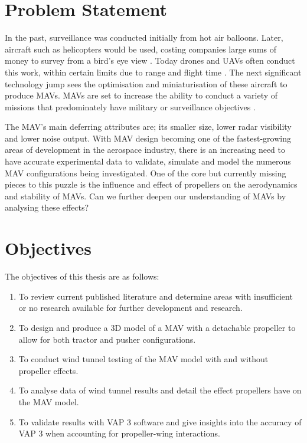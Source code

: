 % 





\section{Problem Statement}
\label{ProblemStatement}

In the past, surveillance was conducted initially from hot air balloons. Later, aircraft such as helicopters would be used, costing companies large sums of money to survey from a bird's eye view \cite{Aleksander2018}. Today drones and UAVs often conduct this work, within certain limits due to range and flight time \cite{NONAMI2007, Aleksander2018}. The next significant technology jump sees the optimisation and miniaturisation of these aircraft to produce MAVs. MAVs are set to increase the ability to conduct a variety of missions that predominately have military or surveillance objectives \cite{Aleksander2018, Mil2022, Greenwood2019, Saytov2022}. 

The MAV's main deferring attributes are; its smaller size, lower radar visibility and lower noise output. With MAV design becoming one of the fastest-growing areas of development in the aerospace industry, there is an increasing need to have accurate experimental data to validate, simulate and model the numerous MAV configurations being investigated. One of the core but currently missing pieces to this puzzle is the influence and effect of propellers on the aerodynamics and stability of MAVs. Can we further deepen our understanding of MAVs by analysing these effects?




\section{Objectives}
\label{sec:Objectives}
The objectives of this thesis are as follows:

\begin{enumerate}
   \item To review current published literature and determine areas with insufficient or no research available for further development and research.
  \item To design and produce a 3D model of a MAV with a detachable propeller to allow for both tractor and pusher configurations.
  \item To conduct wind tunnel testing of the MAV model with and without propeller effects.
  \item To analyse data of wind tunnel results and detail the effect propellers have on the MAV model.
  \item To validate results with VAP 3 software and give insights into the accuracy of VAP 3 when accounting for propeller-wing interactions. 
\end{enumerate}

